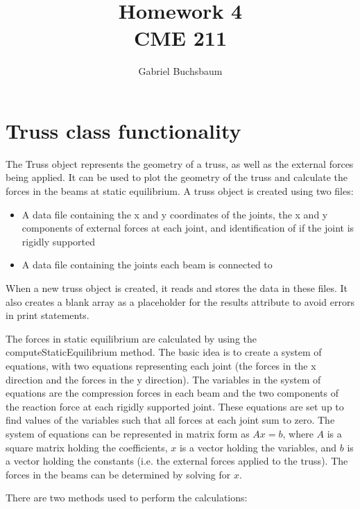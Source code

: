 \documentclass{article}
\title{Homework 4\\CME 211}
\author{Gabriel Buchsbaum}
\begin{document}
\maketitle

\section{Truss class functionality}

The Truss object represents the geometry of a truss, as well as the external 
forces being applied. It can be used to plot the geometry of the truss and
calculate the forces in the beams at static equilibrium. A truss object is
created using two files:

\begin{itemize}
  \item A data file containing the x and y coordinates of the joints, the x
    and y components of external forces at each joint, and identification of if
    the joint is rigidly supported
  
  \item A data file containing the joints each beam is connected to
\end{itemize}

When a new truss object is created, it reads and stores the data in these
files. It also creates a blank array as a placeholder for the results attribute
to avoid errors in print statements.

The forces in static equilibrium are calculated by using the
computeStaticEquilibrium method. The basic idea is to create a system of
equations, with two equations representing each joint (the forces in the x
direction and the forces in the y direction). The variables in the system
of equations are the compression forces in each beam and the two components
of the reaction force at each rigidly supported joint. These equations are
set up to find values of the variables such that all forces at each joint sum
to zero. The system of equations can be represented in matrix form as $Ax = b$,
where $A$ is a square matrix holding the coefficients, $x$ is a vector holding
the variables, and $b$ is a vector holding the constants (i.e. the external
forces applied to the truss). The forces in the beams can be determined by
solving for $x$.

There are two methods used to perform the calculations:
\end{document}
